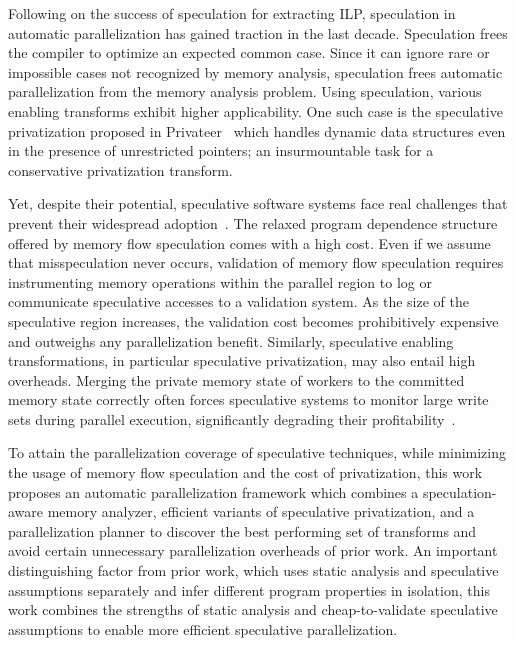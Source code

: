 Following on the success of speculation for extracting ILP,
speculation in automatic parallelization has gained traction in the
last decade.  Speculation frees the compiler to optimize an expected
common case.  Since it can ignore rare or impossible cases not
recognized by memory analysis, speculation frees automatic
parallelization from the memory analysis problem.  Using speculation,
various enabling transforms exhibit higher applicability.  One such
case is the speculative privatization proposed in
Privateer~\cite{johnson:12:pldi} which handles dynamic data structures
even in the presence of unrestricted pointers; an insurmountable task
for a conservative privatization transform.
%
%


Yet, despite their potential, speculative software systems face real
challenges that prevent their widespread
adoption~\cite{cascaval:08:stmtoy:short, .., ..}.
%
%
The relaxed program dependence structure offered by memory flow
speculation comes with a high cost.  Even if we assume that
misspeculation never occurs, validation of memory flow speculation
requires instrumenting memory operations within the parallel region to
log or communicate speculative accesses to a validation system. As the
size of the speculative region increases, the validation cost becomes
prohibitively expensive and outweighs any parallelization benefit.
%
Similarly, speculative enabling transformations,
in particular speculative privatization, may also entail high
overheads.  Merging the private memory state of workers to the
committed memory state correctly often forces speculative systems to monitor
large write sets during parallel execution, significantly degrading
their profitability~\cite{kim:12:cgo,johnson:12:pldi,LRPD?}.

To attain the parallelization coverage of speculative techniques,
while minimizing the usage of memory flow speculation and the cost of
privatization,
%
this work proposes an automatic parallelization framework which
combines a speculation-aware memory analyzer, efficient variants of
speculative privatization, and a parallelization planner
to discover the best performing set of transforms and avoid certain
unnecessary parallelization overheads of prior work.
%
An important distinguishing factor from prior work, which uses static
analysis and speculative assumptions separately and infer different
program properties in isolation, this work combines the strengths of
static analysis and cheap-to-validate speculative assumptions to
enable more efficient speculative parallelization.

